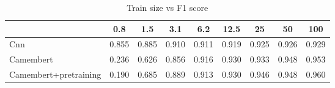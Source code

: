 \begin{table}[!h]

\caption{Train size vs F1 score}
\centering
\begin{tabular}[t]{lcccccccc}
\toprule
  & 0.8 & 1.5 & 3.1 & 6.2 & 12.5 & 25 & 50 & 100\\
\midrule
Cnn & 0.855 & 0.885 & 0.910 & 0.911 & 0.919 & 0.925 & 0.926 & 0.929\\
Camembert & 0.236 & 0.626 & 0.856 & 0.916 & 0.930 & 0.933 & 0.948 & 0.953\\
Camembert+pretraining & 0.190 & 0.685 & 0.889 & 0.913 & 0.930 & 0.946 & 0.948 & 0.960\\
\bottomrule
\end{tabular}
\end{table}